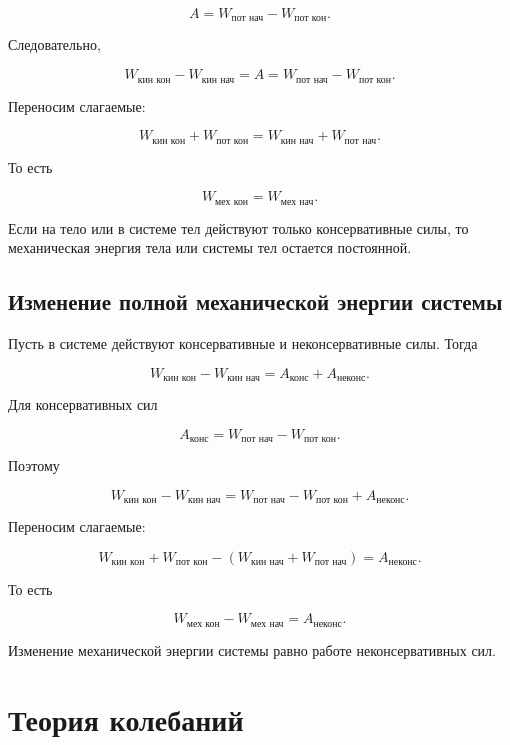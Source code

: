 \documentclass[a4paper,12pt]{article}
\begin{document}
\[
A = W_{\text{пот нач}} - W_{\text{пот кон}}.
\]

Следовательно,

\[
W_{\text{кин кон}} - W_{\text{кин нач}}
=
A
=
W_{\text{пот нач}} - W_{\text{пот кон}}.
\]

Переносим слагаемые:

\[
W_{\text{кин кон}} + W_{\text{пот кон}}
=
W_{\text{кин нач}} + W_{\text{пот нач}}.
\]

То есть

\[
W_{\text{мех кон}} = W_{\text{мех нач}}.
\]

\begin{theorembox}
Если на тело или в системе тел действуют только консервативные силы, то механическая энергия тела или системы тел остается постоянной.
\end{theorembox}

\vspace{0.8em}

\subsection*{Изменение полной механической энергии системы}

Пусть в системе действуют консервативные и неконсервативные силы. Тогда

\[
W_{\text{кин кон}} - W_{\text{кин нач}}
=
A_{\text{конс}} + A_{\text{неконс}}.
\]

Для консервативных сил

\[
A_{\text{конс}}
=
W_{\text{пот нач}} - W_{\text{пот кон}}.
\]

Поэтому

\[
W_{\text{кин кон}} - W_{\text{кин нач}}
=
W_{\text{пот нач}} - W_{\text{пот кон}} + A_{\text{неконс}}.
\]

Переносим слагаемые:

\[
W_{\text{кин кон}} + W_{\text{пот кон}}
-
\left(
W_{\text{кин нач}} + W_{\text{пот нач}}
\right)
=
A_{\text{неконс}}.
\]

То есть

\[
W_{\text{мех кон}} - W_{\text{мех нач}} = A_{\text{неконс}}.
\]

\begin{theorembox}
Изменение механической энергии системы равно работе неконсервативных сил.
\end{theorembox}

\newpage

\section{Теория колебаний}
\end{document}

